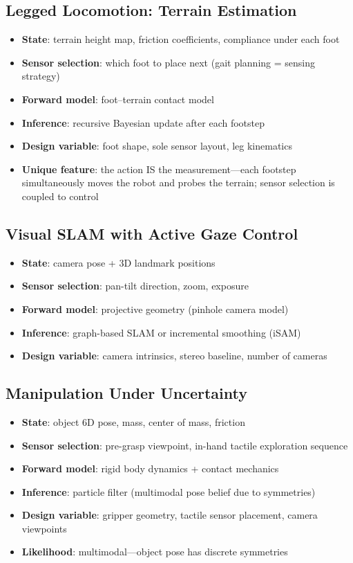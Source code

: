 \documentclass[11pt,a4paper]{article}
\begin{document}
\subsection{Legged Locomotion: Terrain Estimation}

\begin{itemize}[nosep]
  \item \textbf{State}: terrain height map, friction coefficients, compliance under each foot
  \item \textbf{Sensor selection}: which foot to place next (gait planning = sensing strategy)
  \item \textbf{Forward model}: foot--terrain contact model
  \item \textbf{Inference}: recursive Bayesian update after each footstep
  \item \textbf{Design variable}: foot shape, sole sensor layout, leg kinematics
  \item \textbf{Unique feature}: the action IS the measurement---each footstep simultaneously moves the robot and probes the terrain; sensor selection is coupled to control
\end{itemize}

\subsection{Visual SLAM with Active Gaze Control}

\begin{itemize}[nosep]
  \item \textbf{State}: camera pose + 3D landmark positions
  \item \textbf{Sensor selection}: pan-tilt direction, zoom, exposure
  \item \textbf{Forward model}: projective geometry (pinhole camera model)
  \item \textbf{Inference}: graph-based SLAM or incremental smoothing (iSAM)
  \item \textbf{Design variable}: camera intrinsics, stereo baseline, number of cameras
\end{itemize}

\subsection{Manipulation Under Uncertainty}

\begin{itemize}[nosep]
  \item \textbf{State}: object 6D pose, mass, center of mass, friction
  \item \textbf{Sensor selection}: pre-grasp viewpoint, in-hand tactile exploration sequence
  \item \textbf{Forward model}: rigid body dynamics + contact mechanics
  \item \textbf{Inference}: particle filter (multimodal pose belief due to symmetries)
  \item \textbf{Design variable}: gripper geometry, tactile sensor placement, camera viewpoints
  \item \textbf{Likelihood}: multimodal---object pose has discrete symmetries
\end{itemize}
\end{document}

